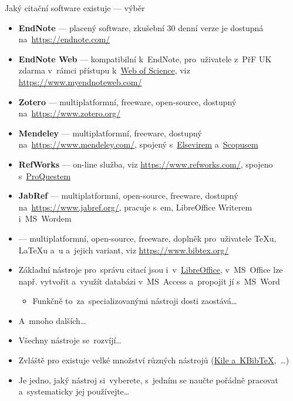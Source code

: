 \documentclass[compress, xelatex, 11pt, xcolor=svgnames, aspectratio=169,
	hyperref={
		bookmarks=true,
		unicode=true,
		colorlinks=true,
		pdftitle={Citacni software},
		plainpages=false,
		pdfauthor={Vojtech Zeisek},
		pdfsubject={Kratky uvod do citacniho software},
		pdfcreator={XeLaTeX},
		pdfkeywords={citace, reference, software, literatura},
		linkcolor=Crimson, %
		anchorcolor=Magenta, %
		citecolor=Magenta, %
		filecolor=Magenta, %
		menucolor=Magenta, %
		urlcolor=DarkTurquoise, %
		},
	url={hyphens, lowtilde} %
	]{beamer}
\begin{document}
\begin{frame}[allowframebreaks]{Jaký citační software existuje --- výběr}
	\begin{itemize}
		\item \textbf{EndNote} --- placený software, zkušební 30 denní verze je dostupná na~\url{https://endnote.com/}
		\item \textbf{EndNote Web} --- kompatibilní k~EndNote, pro~uživatele z~PřF UK zdarma v~rámci přístupu k~\href{https://www.webofscience.com/}{Web of Science}, viz \url{https://www.myendnoteweb.com/}
		\item \textbf{Zotero} --- multiplatformní, freeware, open-source, dostupný na~\url{https://www.zotero.org/}
		\item \textbf{Mendeley} --- multiplatformní, freeware, dostupný na~\url{https://www.mendeley.com/}, spojený s~\href{https://www.elsevier.com/}{Elsevirem}  a~\href{https://www.scopus.com/}{Scopusem}
		\item \textbf{RefWorks} --- on-line služba, viz \url{https://www.refworks.com/}, spojeno s~\href{https://www.proquest.com/}{ProQuestem}
		\item \textbf{JabRef} --- multiplatformní, open-source, freeware, dostupný na~\url{https://www.jabref.org/}, pracuje s~\BibTeX em, LibreOffice Writerem i~MS~Wordem
		\item \textbf{\BibTeX} --- multiplatformní, open-source, freeware, doplněk pro~uživatele \TeX u, \LaTeX u a~\XeLaTeX u a~jejich variant, viz \url{https://www.bibtex.org/}
		\item Základní nástroje pro~správu citací jsou i~v~\href{https://www.openoffice.cz/navody/jak-vytvorit-a-upravovat-seznam-pouzite-literatury}{LibreOffice}, v~MS~Office lze např. vytvořit a~využít databázi v~MS~Access a~propojit jí s~MS~Word
		\begin{itemize}
			\item Funkčně to~za~specializovanými nástroji dosti zaostává\ldots
		\end{itemize}
		\item A~mnoho dalších\ldots
		\item Všechny nástroje se~rozvíjí\ldots
		\item Zvláště pro \BibTeX{ }existuje velké množství různých nástrojů (\href{https://www.linuxexpres.cz/software/kile-a-kbibtex}{Kile a~KBibTeX},~\ldots)
		\item Je jedno, jaký nástroj si~vyberete, s~jedním se naučte pořádně pracovat a~systematicky jej používejte\ldots
	\end{itemize}
\end{frame}
\end{document}
